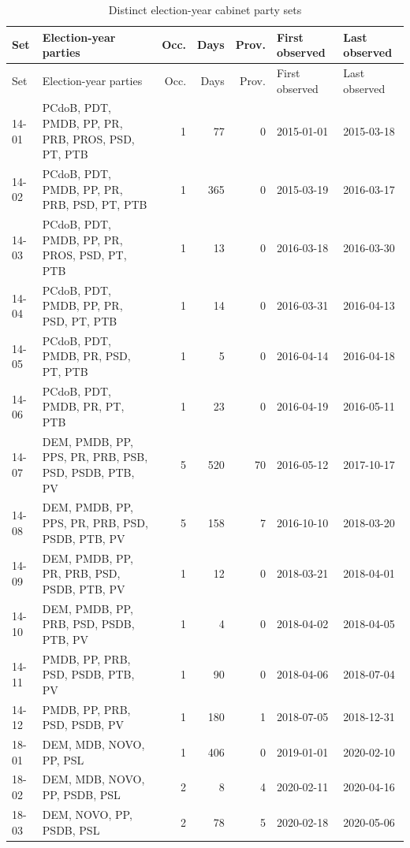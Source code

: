 \begin{landscape}
\fontsize{9}{10}\selectfont
\setlength{\LTpost}{0pt}
\setlength{\tabcolsep}{4pt}
\renewcommand{\arraystretch}{1.0}
\begin{longtable}{@{}lp{12.2cm}rrrll@{}}
\caption{Distinct election-year cabinet party sets}\label{tab:full-cabinet-composition}\\
\toprule
Set & Election-year parties & Occ. & Days & Prov. & First observed & Last observed \\
\midrule
\endfirsthead
\toprule
Set & Election-year parties & Occ. & Days & Prov. & First observed & Last observed \\
\midrule
\endhead
14-01 & PCdoB, PDT, PMDB, PP, PR, PRB, PROS, PSD, PT, PTB & 1 & 77 & 0 & 2015-01-01 & 2015-03-18 \\
14-02 & PCdoB, PDT, PMDB, PP, PR, PRB, PSD, PT, PTB & 1 & 365 & 0 & 2015-03-19 & 2016-03-17 \\
14-03 & PCdoB, PDT, PMDB, PP, PR, PROS, PSD, PT, PTB & 1 & 13 & 0 & 2016-03-18 & 2016-03-30 \\
14-04 & PCdoB, PDT, PMDB, PP, PR, PSD, PT, PTB & 1 & 14 & 0 & 2016-03-31 & 2016-04-13 \\
14-05 & PCdoB, PDT, PMDB, PR, PSD, PT, PTB & 1 & 5 & 0 & 2016-04-14 & 2016-04-18 \\
14-06 & PCdoB, PDT, PMDB, PR, PT, PTB & 1 & 23 & 0 & 2016-04-19 & 2016-05-11 \\
14-07 & DEM, PMDB, PP, PPS, PR, PRB, PSB, PSD, PSDB, PTB, PV & 5 & 520 & 70 & 2016-05-12 & 2017-10-17 \\
14-08 & DEM, PMDB, PP, PPS, PR, PRB, PSD, PSDB, PTB, PV & 5 & 158 & 7 & 2016-10-10 & 2018-03-20 \\
14-09 & DEM, PMDB, PP, PR, PRB, PSD, PSDB, PTB, PV & 1 & 12 & 0 & 2018-03-21 & 2018-04-01 \\
14-10 & DEM, PMDB, PP, PRB, PSD, PSDB, PTB, PV & 1 & 4 & 0 & 2018-04-02 & 2018-04-05 \\
14-11 & PMDB, PP, PRB, PSD, PSDB, PTB, PV & 1 & 90 & 0 & 2018-04-06 & 2018-07-04 \\
14-12 & PMDB, PP, PRB, PSD, PSDB, PV & 1 & 180 & 1 & 2018-07-05 & 2018-12-31 \\
18-01 & DEM, MDB, NOVO, PP, PSL & 1 & 406 & 0 & 2019-01-01 & 2020-02-10 \\
18-02 & DEM, MDB, NOVO, PP, PSDB, PSL & 2 & 8 & 4 & 2020-02-11 & 2020-04-16 \\
18-03 & DEM, NOVO, PP, PSDB, PSL & 2 & 78 & 5 & 2020-02-18 & 2020-05-06 \\

\end{longtable}
\end{landscape}
